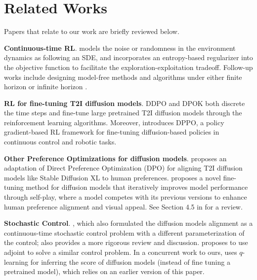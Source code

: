 \section{Related Works}
Papers that relate to our work are briefly reviewed below.

\textbf{Continuous-time RL}. \cite{wang2020reinforcement} models the noise or randomness in the environment dynamics as following an SDE, and incorporates an entropy-based regularizer into the objective function to facilitate the exploration-exploitation tradeoff. Follow-up works include designing model-free methods and algorithms under either finite horizon \cite{jia2022policy_evaluation, jia2022policy_gradient, jia2022q_learning} or infinite horizon \cite{zhao2024policy}. 

\textbf{RL for fine-tuning T2I diffusion models}. DDPO \cite{DDPO} and DPOK \cite{DPOK} both discrete the time steps and fine-tune large pretrained T2I diffusion models through the reinforcement learning algorithms. Moreover, \cite{dppo} introduces DPPO, a policy gradient-based RL framework for fine-tuning diffusion-based policies in continuous control and robotic tasks.

\textbf{Other Preference Optimizations for diffusion models}. \cite{diffusiondpo} proposes an adaptation of Direct Preference Optimization (DPO) for aligning T2I diffusion models like Stable Diffusion XL to human preferences. 
\cite{yuan2024self} proposes a novel fine-tuning method for diffusion models that iteratively improves model performance through self-play, where a model competes with its previous versions to enhance human preference alignment and visual appeal. 
See Section 4.5 in \cite{winata2024preference} for a review.

\textbf{Stochastic Control}. \cite{uehara2024continuous-fine-tune}, which also formulated the diffusion models alignment as a continuous-time stochastic control problem with a different parameterization of the control; \cite{Tang24} also provides a more rigorous review and discussion. \cite{domingo2024adjoint} proposes to use adjoint to solve a similar control problem. 
In a concurrent work to ours,  
\cite{gao2024reward} uses $q$-learning \cite{jia2022q_learning} for inferring the score of diffusion models 
(instead of fine tuning a pretrained model),
which relies on an earlier version \cite{zhao2024scores} of this paper.

